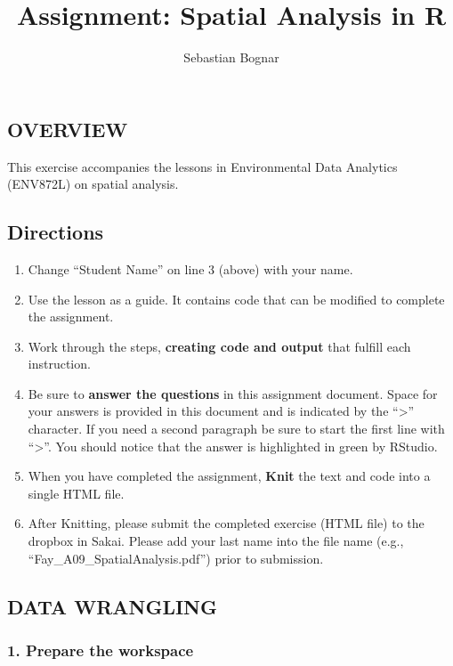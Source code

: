 \documentclass[]{article}
\title{Assignment: Spatial Analysis in R}
\author{Sebastian Bognar}
\date{}
\providecommand{\tightlist}{%
  \setlength{\itemsep}{0pt}\setlength{\parskip}{0pt}}
\begin{document}
\maketitle

{
\setcounter{tocdepth}{2}
\tableofcontents
}
\subsection{OVERVIEW}\label{overview}

This exercise accompanies the lessons in Environmental Data Analytics
(ENV872L) on spatial analysis.

\subsection{Directions}\label{directions}

\begin{enumerate}
\def\labelenumi{\arabic{enumi}.}
\tightlist
\item
  Change ``Student Name'' on line 3 (above) with your name.
\item
  Use the lesson as a guide. It contains code that can be modified to
  complete the assignment.
\item
  Work through the steps, \textbf{creating code and output} that fulfill
  each instruction.
\item
  Be sure to \textbf{answer the questions} in this assignment document.
  Space for your answers is provided in this document and is indicated
  by the ``\textgreater{}'' character. If you need a second paragraph be
  sure to start the first line with ``\textgreater{}''. You should
  notice that the answer is highlighted in green by RStudio.
\item
  When you have completed the assignment, \textbf{Knit} the text and
  code into a single HTML file.
\item
  After Knitting, please submit the completed exercise (HTML file) to
  the dropbox in Sakai. Please add your last name into the file name
  (e.g., ``Fay\_A09\_SpatialAnalysis.pdf'') prior to submission.
\end{enumerate}

\subsection{DATA WRANGLING}\label{data-wrangling}

\subsubsection{1. Prepare the workspace}\label{prepare-the-workspace}
\end{document}
